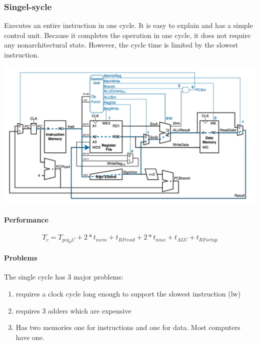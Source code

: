 		\subsubsection{Singel-sycle}
			Executes an entire instruction in one cycle. It is easy to explain and has a simple control unit. Because it completes the operation in one cycle, it does not require any nonarchitectural state. However, the cycle time is limited by the slowest instruction.
			\begin{center}
				\includegraphics[width = 15cm]{images/single.png}
			\end{center}
			\paragraph{Performance}
			\begin{equation}
				T_c = T_{pcq_PC} + 2*t_{mem} + t_{RFread} + 2*t_{mux} + t_{ALU} + t_{RFsetup}
			\end{equation}
			\paragraph{Problems}
				The single cycle has 3 major problems:
				\begin{enumerate}
					\item requires a clock cycle long enough to support the slowest instruction (lw)
					\item requires 3 adders which are expensive
					\item Has two memories one for instructions and one for data. Most computers have one.
				\end{enumerate}
